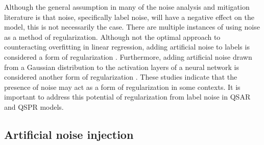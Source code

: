Although the general assumption in many of the noise analysis and mitigation literature is that noise, specifically label noise, will have a negative effect on the model, this is not necessarily the case. There are multiple instances of using noise as a method of regularization. Although not the optimal approach to counteracting overfitting in linear regression, adding artificial noise to labels is considered a form of regularization \citep{Ullah2024}. Furthermore, adding artificial noise drawn from a Gaussian distribution to the activation layers of a neural network is considered another form of regularization \citep{Camuto2021}. These studies indicate that the presence of noise may act as a form of regularization in some contexts. It is important to address this potential of regularization from label noise in QSAR and QSPR models.

\subsection{Artificial noise injection}\label{sec:noise_injection}

